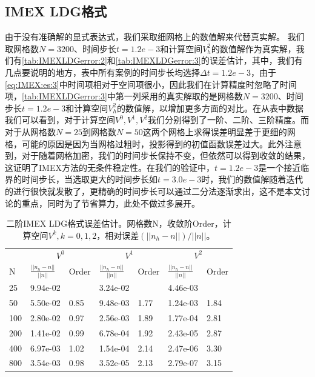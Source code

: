 \subsection{IMEX LDG格式}
由于没有准确解的显式表达式，我们采取细网格上的数值解来代替真实解。
我们取网格数$N=3200$、时间步长$t=1.2e-3$和计算空间$V_h^2$的数值解作为真实解，我们有\autoref{tab:IMEXLDGerror:2}和\autoref{tab:IMEXLDGerror:3}的误差估计，其中，我们有几点要说明的地方，表中所有案例的时间步长均选择$\Delta t = 1.2e-3$，由于\eqref{eq:IMEX:es:3}中时间项相对于空间项很小，因此我们在计算精度时忽略了时间项，\autoref{tab:IMEXLDGerror:3}中第一列采用的真实解取的是网格数$N=3200$、时间步长$t=1.2e-3$和计算空间$V_h^2$的数值解，以增加更多方面的对比。在从表中数据我们可以看到，对于计算空间$V^0, V^1, V^2$我们分别得到了一阶、二阶、三阶精度。而对于从网格数$N=25$到网格数$N=50$这两个网格上求得误差明显差于更细的网格，可能的原因是因为当网格过粗时，投影得到的初值函数误差过大。此外注意到，对于随着网格加密，我们的时间步长保持不变，但依然可以得到收敛的结果，这证明了IMEX方法的无条件稳定性。在我们的验证中，$t=1.2e-3$是一个接近临界的时间步长，当选取更大的时间步长如$t=3.0e-3$时，我们的数值解随着迭代的进行很快就发散了，更精确的时间步长可以通过二分法逐渐求出，这不是本文讨论的重点，同时为了节省算力，此处不做过多展开。
\begin{table}
    \begin{tabularx}{\textwidth}{@{} *7{X} @{}}
        \toprule
            & \multicolumn{2}{c}{$V^0$} & \multicolumn{2}{c}{$V^1$} & \multicolumn{2}{c}{$V^2$}                                                     \\
        \cmidrule(lr){2-3} \cmidrule(lr){4-5} \cmidrule(lr){6-7}
        N   & $\frac{||n_h-n||}{||n||}$ & Order                     & $\frac{||n_h-n||}{||n||}$ & Order     & $\frac{||n_h-n||}{||n||}$ & Order     \\
        \midrule
        25  & 9.94e-02                  & \text{——}                 & 3.24e-02                  & \text{——} & 4.46e-03                  & \text{——} \\
        50  & 5.50e-02                  & 0.85                      & 9.48e-03                  & 1.77      & 1.24e-03                  & 1.84      \\
        100 & 2.80e-02                  & 0.97                      & 2.56e-03                  & 1.89      & 1.77e-04                  & 2.81      \\
        200 & 1.41e-02                  & 0.99                      & 6.78e-04                  & 1.92      & 2.43e-05                  & 2.87      \\
        400 & 6.97e-03                  & 1.02                      & 1.54e-04                  & 2.14      & 2.47e-06                  & 3.30      \\
        800 & 3.54e-03                  & 0.98                      & 3.52e-05                  & 2.13      & 2.79e-07                  & 3.15      \\
        \bottomrule
    \end{tabularx}
    \caption{二阶IMEX LDG格式误差估计。网格数N，收敛阶Order，计算空间$V^k, k=0,1,2$，相对误差$(||n_h-n||)/||n||$。}
    \label{tab:IMEXLDGerror:2}
\end{table}

